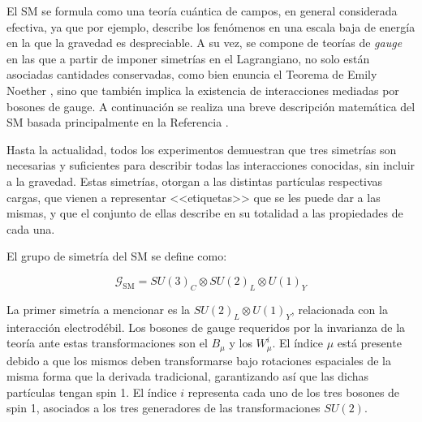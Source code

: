 El SM se formula como una teoría cuántica de campos, en general considerada efectiva, ya que por ejemplo, describe los fenómenos en una escala baja de energía en la que la gravedad es despreciable. A su vez, se compone de teorías de \textit{gauge} en las que a partir de imponer simetrías en el Lagrangiano, no solo están asociadas cantidades conservadas, como bien enuncia el Teorema de Emily Noether \cite{noether}, sino que también implica la existencia de interacciones mediadas por bosones de gauge. A continuación se realiza una breve descripción matemática del SM basada principalmente en la Referencia \cite{gkane}.

Hasta la actualidad, todos los experimentos demuestran que tres simetrías son necesarias y suficientes para describir todas las interacciones conocidas, sin incluir a la gravedad. Estas simetrías, otorgan a las distintas partículas respectivas cargas, que vienen a representar <<etiquetas>> que se les puede dar a las mismas, y que el conjunto de ellas describe en su totalidad a las propiedades de cada una.

El grupo de simetría del SM se define como:

\begin{equation}
	\mathcal{G}_{\text{SM}} = SU(3)_C \otimes SU(2)_L \otimes U(1)_Y
\end{equation}

La primer simetría a mencionar es la $SU(2)_L \otimes U(1)_Y$, relacionada con la interacción electrodébil. Los bosones de gauge requeridos por la invarianza de la teoría ante estas transformaciones son el $B_{\mu}$ y los $W_{\mu}^{i}$. El índice $\mu$ está presente debido a que los mismos deben transformarse bajo rotaciones espaciales de la misma forma que la derivada tradicional, garantizando así que las dichas partículas tengan spin 1. El índice $i$ representa cada uno de los tres bosones de spin 1, asociados a los tres generadores de las transformaciones $SU(2)$.


